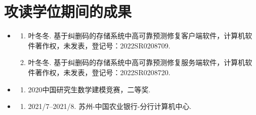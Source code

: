 \chapter{攻读学位期间的成果}

\begin{itemize}
	\setlength{\itemsep}{5pt}
	
	\item \textbf{\heiti{}}
	      \begin{enumerate}
	      	\setlength{\itemsep}{-\itemsep}  %
	      	\item 叶冬冬. 基于纠删码的存储系统中高可靠预测修复客户端软件，计算机软件著作权，未发表，登记号：2022SR0208709.
	      	\item 叶冬冬. 基于纠删码的存储系统中高可靠预测修复服务端软件，计算机软件著作权，未发表，登记号：2022SR0208720.
	      \end{enumerate}
	      
	\item \textbf{\heiti{}}
	      \begin{enumerate}
	      	\item 2020中国研究生数学建模竞赛，二等奖.
	      \end{enumerate}
	      
	\item \textbf{\heiti{}}
	      \begin{enumerate}
	      	\item \textsc{2021/7--2021/8}. 苏州-中国农业银行-分行计算机中心.
	      \end{enumerate}
	      
\end{itemize}


